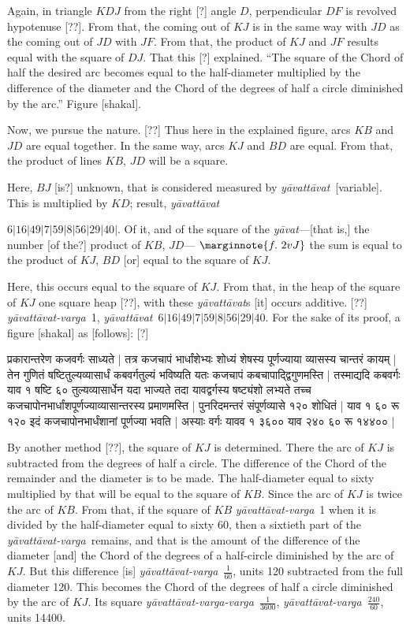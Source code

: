 \documentclass[12pt]{book}
\def\ya{\textit{y\=avat\-t\=avat}}
\def\yava{\textit{y\=avat\-t\=avat-varga}}
\def\yavava{\textit{y\=avat\-t\=avat-varga-varga}}
\begin{document}
\newpage

Again, in triangle $KDJ$ from the right [?] angle $D$, perpendicular $DF$ 
is revolved hypotenuse [??].  From that, the coming out of $KJ$ is in the same
way with $JD$ as the coming out of $JD$ with $JF$. 
From that, the product of $KJ$ and $JF$ results equal with the square of 
$DJ$. That this [?] explained. ``The square of the Chord of half the desired arc
becomes equal to the half-diameter multiplied by the difference of the 
diameter and the Chord of the degrees of half a circle diminished by the arc.''
Figure [shakal]. 

Now, we pursue the nature.  [??] Thus here in the explained figure, arcs
$KB$ and $JD$ are equal together. In the same way, arcs $KJ$ and  $BD$ 
are equal.  From that, the product of lines $KB$, $JD$ will be a square.

Here, $BJ$ [is?] unknown, that is considered measured by \ya\ [variable]. 
This is multiplied by $KD$; result, \ya\ 

$6|16|49|7|59|8|56|29|40|$. 
Of it, and of the square of the \textit{y\=avat}---[that is,] 
the number [of the?] product of $KB$, $JD$---
$\marginnote{f.~2v J}$ 
the sum is equal to the product of $KJ$, $BD$ [or] equal to the square of $KJ$.

Here, this occurs equal to the square of $KJ$. From that, in the heap of the
square of $KJ$ one square heap [??], with these \ya s [it] occurs additive. [??]
\yava\ 1, \ya\ $6|16|49|7|59|8|56|29|40$. For the sake of its proof, a figure
[shakal] as [follows]: [?] 

\newpage

{\s प्रकारान्तरेण कजवर्गः साध्यते | तत्र कजचापं
भार्धांशेभ्यः शोध्यं शेषस्य पूर्णज्याया व्यासस्य चान्तरं कायम् |
तेन
गुणितं षष्टितुल्यव्यासार्धं कबवर्गतुल्यं भविष्यति
यतः कजचापं
कबचापाद्द्विगुणमस्ति |
तस्माद्यदि कबवर्गः याव १ षष्टि ६० तुल्यव्यासार्धेन यदा
भाज्यते तदा यावद्वर्गस्य षष्ट्यंशो लभ्यते तच्च
कजचापोनभार्धांशपूर्णज्याव्यासान्तरस्य प्रमाणमस्ति | पुनरिदमन्तरं
संपूर्णव्यासे १२० शोधितं | याव १ ६० रू १२० इदं
कजचापोनभार्धंशानां पूर्णज्या भवति |
अस्याः वर्गः यावव १ ३६०० याव
२४० ६० रू १४४०० |}

\newpage

By another method [??], the square of $KJ$ is determined.  There the arc of $KJ$ 
is subtracted from the degrees of half a circle. The difference of the Chord of the
remainder and the diameter is to be made. The half-diameter equal to sixty 
multiplied by that will be equal to the square of $KB$. Since the arc of $KJ$
is twice the arc of $KB$.  From that, if the square of $KB$ \yava\ 1 when it is
divided by the half-diameter equal to sixty 60, then a sixtieth part of the 
\yava\ remains, and that is the amount of the difference
of the diameter [and] the Chord of the degrees of a half-circle
diminished by the arc of $KJ$.  But this difference [is] \yava\ $\frac{1}{60}$, units 120
subtracted from the 
full diameter 120. This becomes the 
Chord of the degrees of half a circle diminished by the arc of $KJ$. 
Its square \yavava\ $\frac{1}{3600}$, \yava\ $\frac{240}{60}$, units 14400. 
\end{document}
